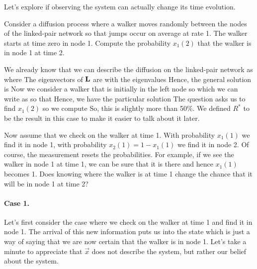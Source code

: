 Let's explore if observing the system can actually change its time evolution. 

\subquestion
Consider a diffusion process where a walker moves randomly between the nodes of the linked-pair network so that jumps occur on average at rate 1. The walker starts at time zero in node 1. Compute the probability $x_1(2)$ that the walker is in node 1 at time 2.

\solution 
We already know that we can describe the diffusion on the linked-pair network as 
where 
The eigenvectors of $\bf L$ are 
with the eigenvalues 
Hence, the general solution is 
Now we consider a walker that is initially in the left node so 
which we can write as 
so that 
Hence, we have the particular solution
The question asks us to find $x_1(2)$ so we compute 
So, this is slightly more than 50\%. We defined $R^*$ to be the result in this case to make it easier to talk about it later. 

\subquestion 
Now assume that we check on the walker at time 1. With probability $x_1(1)$ we find it in node 1, with probability $x_2(1)=1-x_1(1)$ we find it in node 2. Of course, the measurement resets the probabilities. For example, if we see the walker in node 1 at time 1, we can be sure that it is there and hence $x_1(1)$ becomes 1. 
Does knowing where the walker is at time 1 change the chance that it will be in node 1 at time 2? 

\solution 
\paragraph{Case 1.} Let's first consider the case where we check on the walker at time 1 and find it in node 1. The arrival of this new information puts us into the state 
which is just a way of saying that we are now certain that the walker is in node 1. Let's take a minute to appreciate that $\vec{x}$ does not describe the system, but rather our belief about the system. 

